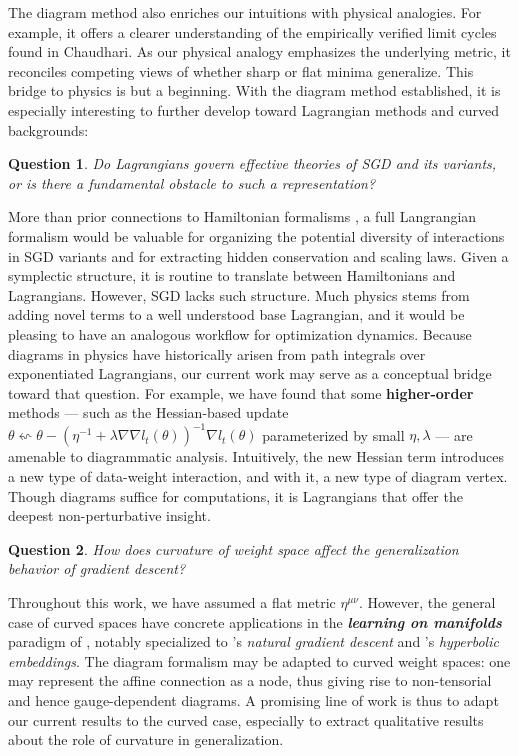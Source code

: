 \documentclass{article}
\newtheorem{quest}{Question}
\begin{document}
    The diagram method also enriches our intuitions with physical analogies.
    For example, it offers a clearer understanding of the empirically verified
    limit cycles found in Chaudhari.  As our physical analogy emphasizes the
    underlying metric, it reconciles competing views of whether sharp or flat
    minima generalize.  This bridge to physics is but a beginning.  With the
    diagram method established, it is especially interesting to further develop
    toward Lagrangian methods and curved backgrounds: 
    \begin{quest}
        Do Lagrangians govern effective theories of SGD and its variants, or
        is there a fundamental obstacle to such a representation?
    \end{quest}
        More than prior connections to Hamiltonian formalisms \cite{ch14}, a
        full Langrangian formalism would be valuable for organizing the
        potential diversity of interactions in SGD variants and for extracting
        hidden conservation and scaling laws.  Given a symplectic structure, it
        is routine to translate between Hamiltonians and Lagrangians.  However,
        SGD lacks such structure.  Much physics stems from adding novel terms
        to a well understood base Lagrangian, and it would be pleasing to have
        an analogous workflow for optimization dynamics.  Because diagrams in
        physics have historically arisen from path integrals over exponentiated
        Lagrangians, our current work may serve as a conceptual bridge toward
        that question.  For example, we have found that some {\bf higher-order}
        methods --- such as the Hessian-based update
        $
            \theta \leftsquigarrow
            \theta -
            (\eta^{-1} + \lambda \nabla \nabla l_t(\theta))^{-1}
            \nabla l_t(\theta)
        $
        parameterized by small $\eta, \lambda$ --- are amenable to diagrammatic
        analysis.  Intuitively, the new Hessian term introduces a new type of
        data-weight interaction, and with it, a new type of diagram vertex.
        Though diagrams suffice for computations, it is Lagrangians that offer
        the deepest non-perturbative insight.
    \begin{quest}
        How does curvature of weight space affect the generalization behavior
        of gradient descent?
    \end{quest}
        Throughout this work, we have assumed a flat metric $\eta^{\mu\nu}$.
        However, the general case of curved spaces have concrete applications
        in the \emph{\bf learning on manifolds} paradigm of \citep{bo13}, notably
        specialized to \citep{am98}'s \emph{natural gradient descent} and
        \citep{ni17}'s \emph{hyperbolic embeddings}.  The diagram formalism may
        be adapted to curved weight spaces: one may represent the affine
        connection as a node, thus giving rise to non-tensorial and hence
        gauge-dependent diagrams.  A promising line of work is thus to adapt
        our current results to the curved case, especially to extract
        qualitative results about the role of curvature in generalization.
\end{document}
